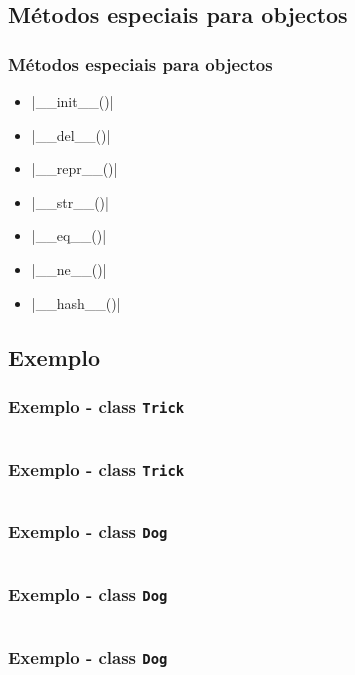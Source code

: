 \documentclass{beamer}
\begin{document}
	\subsection*{Métodos especiais para objectos}
	\begin{frame}[fragile]
		\frametitle{Métodos especiais para objectos}
		\begin{itemize}
			\item {}|__init__()| \pause
			\item {}|__del__()| \pause
			\item {}|__repr__()| \pause
			\item {}|__str__()| \pause
			\item {}|__eq__()| \pause
			\item {}|__ne__()| \pause
			\item {}|__hash__()|
		\end{itemize}
	\end{frame}
	
	\subsection*{Exemplo}
	\begin{frame}[fragile]
		\frametitle{Exemplo - class \texttt{Trick}}
		\inputminted[breaklines, firstline=4, lastline=13]{python}{classExample.py}
	\end{frame}
	
	\begin{frame}[fragile]
		\frametitle{Exemplo - class \texttt{Trick}}
		\inputminted[breaklines, firstline=15, lastline=24]{python}{classExample.py}
	\end{frame}
	
	\begin{frame}[fragile]
		\frametitle{Exemplo - class \texttt{Dog}}
		\inputminted[breaklines, firstline=27, lastline=35]{python}{classExample.py}
	\end{frame}
	
	\begin{frame}[fragile]
		\frametitle{Exemplo - class \texttt{Dog}}
		\inputminted[breaklines, firstline=37, lastline=45]{python}{classExample.py}
	\end{frame}
	
	\begin{frame}[fragile]
		\frametitle{Exemplo - class \texttt{Dog}}
		\inputminted[breaklines, firstline=47, lastline=57]{python}{classExample.py}
	\end{frame}
	
\end{document}
